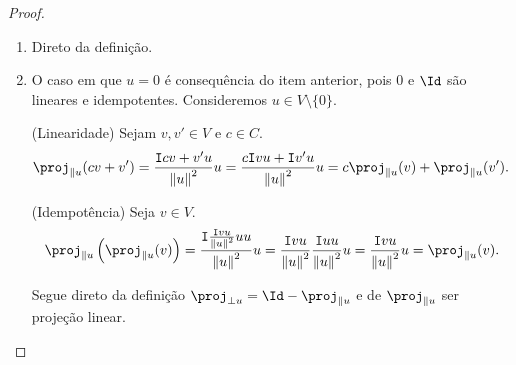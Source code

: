 \begin{proof}
	\begin{enumerate}
	\item Direto da definição.
	
	\item O caso em que $u = 0$ é consequência do item anterior, pois $0$ e $\Id$ são lineares e idempotentes. Consideremos $u \in V \setminus \{0\}$.

	(Linearidade) Sejam $v,v' \in V$ e $c \in C$.
	\begin{equation*}
	\proj_{\parallel u}(cv+v') = \frac{\inte{cv+v'}{u}}{\nor{u}^2}u = \frac{c\inte{v}{u} + \inte{v'}{u}}{\nor{u}^2}u = c\proj_{\parallel u}(v) + \proj_{\parallel u}(v').
	\end{equation*}	
	
(Idempotência) Seja $v \in V$.
		\begin{equation*}
		\proj_{\parallel u}\left( \proj_{\parallel u}(v) \right) = \frac{\inte{\frac{\inte{v}{u}}{\nor{u}^2}u}{u}}{\nor{u}^2}u = \frac{\inte{v}{u}}{\nor{u}^2}\frac{\inte{u}{u}}{\nor{u}^2}u = \frac{\inte{v}{u}}{\nor{u}^2}u = \proj_{\parallel u}(v).
		\end{equation*}

	Segue direto da definição $\proj_{\perp u} = \Id-\proj_{\parallel u}$ e de $\proj_{\parallel u}$ ser projeção linear.

\end{enumerate}
\end{proof}
